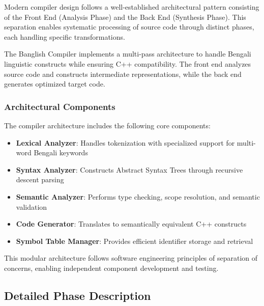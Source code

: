 \documentclass[12pt,a4paper]{article}
\begin{document}
Modern compiler design follows a well-established architectural pattern consisting of the Front End (Analysis Phase) and the Back End (Synthesis Phase). This separation enables systematic processing of source code through distinct phases, each handling specific transformations.

The Banglish Compiler implements a multi-pass architecture to handle Bengali linguistic constructs while ensuring C++ compatibility. The front end analyzes source code and constructs intermediate representations, while the back end generates optimized target code.

\subsubsection{Architectural Components}

The compiler architecture includes the following core components:

\begin{itemize}[leftmargin=*,itemsep=2pt]
    \item \textbf{Lexical Analyzer}: Handles tokenization with specialized support for multi-word Bengali keywords
    \item \textbf{Syntax Analyzer}: Constructs Abstract Syntax Trees through recursive descent parsing
    \item \textbf{Semantic Analyzer}: Performs type checking, scope resolution, and semantic validation
    \item \textbf{Code Generator}: Translates to semantically equivalent C++ constructs
    \item \textbf{Symbol Table Manager}: Provides efficient identifier storage and retrieval
\end{itemize}

This modular architecture follows software engineering principles of separation of concerns, enabling independent component development and testing.

\subsection{Detailed Phase Description}
\end{document}
